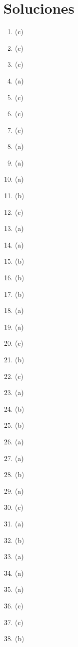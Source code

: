 \section{Soluciones} \begin{enumerate} \item (c) \item (c) \item (c) \item (a) \item (c) 

%
\item (c) \item (c) \item (a) \item (a) \item (a) 

%
\item (b) \item (c) \item (a) \item (a) \item (b) 

%
\item (b) \item (b) \item (a) \item (a) \item (c) 

%
\item (b) \item (c) \item (a) \item (b) \item (b) 

%
\item (a) \item (a) \item (b) \item (a) \item (c) 

%
\item (a) \item (b) \item (a) \item (a) \item (a) 

%
\item (c) \item (c) \item (b) \end{enumerate} 

